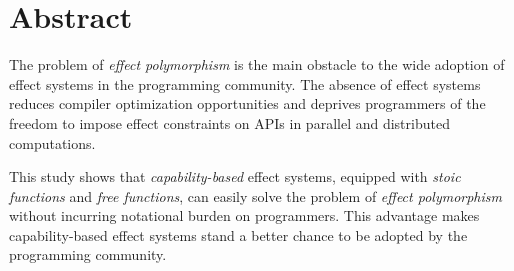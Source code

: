 \section*{\centering Abstract}

The problem of \emph{effect polymorphism} is the main obstacle to the
wide adoption of effect systems in the programming community. The
absence of effect systems reduces compiler optimization opportunities
and deprives programmers of the freedom to impose effect constraints
on APIs in parallel and distributed computations.

This study shows that \emph{capability-based} effect systems, equipped
with \emph{stoic functions} and \emph{free functions}, can easily
solve the problem of \emph{effect polymorphism} without incurring
notational burden on programmers. This advantage makes
capability-based effect systems stand a better chance to be adopted by
the programming community.
